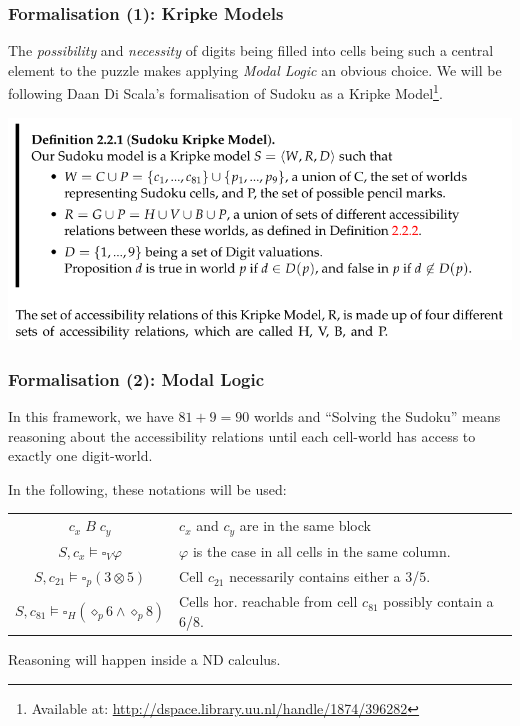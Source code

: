 \documentclass[aspectratio=169, usenames, dvipsnames]{beamer}
\begin{document}
\begin{frame}
\frametitle{Formalisation (1): Kripke Models}
The \emph{possibility} and \emph{necessity} of digits being filled into cells being such a central element to the puzzle makes applying \emph{Modal Logic} an obvious choice. We will be following Daan Di Scala's formalisation of Sudoku as a Kripke Model\footnote{Available at: \url{http://dspace.library.uu.nl/handle/1874/396282}}.

\begin{center}
\includegraphics[scale=0.35]{images/kripke_model.png} 
\end{center}
\end{frame}

\begin{frame}
\frametitle{Formalisation (2): Modal Logic}
In this framework, we have $81 + 9 = 90$ worlds and ``Solving the Sudoku'' means reasoning about the accessibility relations until each cell-world has access to exactly one digit-world.
\bigskip

In the following, these notations will be used:
\medskip

\begin{center}
\begin{tabular}{ c | l }
  $c_x \; B \; c_y$ & $c_x$ and $c_y$ are in the same block\\
  $S, c_x \vDash \square_V \varphi$ & $\varphi$ is the case in all cells in the same column.\\
  $S, c_{21} \vDash \square_p (3 \otimes 5)$ & Cell $c_{21}$ necessarily contains either a $3$/$5$.\\
  $S, c_{81} \vDash \square_H (\diamond_p 6 \wedge \diamond_p 8)$ & Cells hor. reachable from cell $c_{81}$ possibly contain a $6$/$8$.
\end{tabular}
\end{center}

Reasoning will happen inside a ND calculus.
\end{frame}
\end{document}
